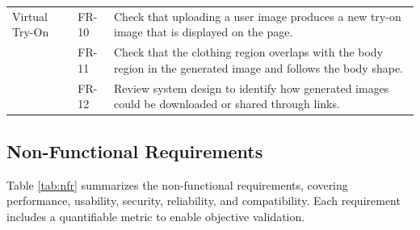 \begin{table}[h]
\begin{tabular}{p{3.2cm}p{1.5cm}p{10cm}}
Virtual Try-On 
& FR-10 
& Check that uploading a user image produces a new try-on image that is displayed on the page. \\

& FR-11 
& Check that the clothing region overlaps with the body region in the generated image and follows the body shape. \\

& FR-12 
& Review system design to identify how generated images could be downloaded or shared through links. \\

\bottomrule
\end{tabular}
\end{table}


\subsection{Non-Functional Requirements}
Table \ref{tab:nfr} summarizes the non-functional requirements, covering performance, usability, security, reliability, and compatibility. Each requirement includes a quantifiable metric to enable objective validation.

